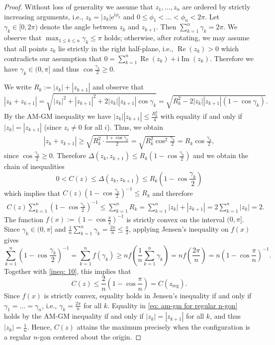 \documentclass[reqno,hidelinks,11pt]{amsart}
\numberwithin{equation}{section}
\begin{document}
\begin{proof}
Without loss of generality we assume that $z_1,\dots,z_n$ are ordered by strictly increasing arguments, i.e., $z_k = |z_k| \mathrm{e}^{\mathrm{i} \phi_k}$ and $0 \leq \phi_1 < \dots < \phi_n < 2\pi$.
Let $\gamma_k \in [0,2\pi)$ denote the angle between $z_k$ and $z_{k+1}$. Then $\sum_{k=1}^n \gamma_k = 2\pi$.
We observe that $\max_{1 \leq k \leq n} \gamma_k \leq \pi$ holds; otherwise, after rotating, we may assume that all points $z_k$ lie strictly in the right half-plane, i.e., $\operatorname{Re}(z_k)> 0$ which contradicts our assumption that $0=\sum_{k=1}^n \operatorname{Re}(z_k) + \mathrm{i} \operatorname{Im}(z_k)$.
Therefore we have $\gamma_k\in (0,\pi]$ and thus $\cos \frac{\gamma_k}{2} \geq 0$.

We write $R_k:=|z_k|+|z_{k+1}|$ and observe that
\[ 
|z_k+z_{k+1}|= \sqrt{|z_k|^2+|z_{k+1}|^2+2|z_k| |z_{k+1}| \cos \gamma_k} = \sqrt{R_k^2-2|z_k| |z_{k+1}| (1-\cos \gamma_k)}.
\]
By the AM-GM inequality we have $|z_k| |z_{k+1}| \leq \frac{R_k^2}{4}$ with equality if and only if $|z_k|=|z_{k+1}|$ (since $z_i \neq 0$ for all $i$). Thus, we obtain 
\begin{align}\label{eq: am-gm for regular n-gon}
|z_k+z_{k+1}|\geq \sqrt{R_k^2 \cdot \frac{1+\cos \gamma_k}{2}} = \sqrt{R_k^2 \cos^2 \frac{\gamma_k}{2} }= R_k \cos \frac{\gamma_k}{2},    
\end{align}
since $\cos \frac{\gamma_k}{2} \geq 0 $. 
Therefore $\Delta(z_k,z_{k+1}) \leq R_k \left( 1-\cos  \frac{\gamma_k}{2} \right)$ and we obtain the chain of inequalities
\[ 0 < C(z) \leq \Delta (z_k,z_{k+1}) \leq R_k\left( 1-\cos \frac{\gamma_k}{2} \right)\]
which implies that
$C(z)\left(1-\cos \frac{\gamma_k}{2}\right)^{-1} \leq R_k$
and therefore 
\begin{align} \label{ineq: 10}
    C(z) \sum_{k=1}^n \left(1-\cos \frac{\gamma_k}{2}\right)^{-1} \leq \sum_{k=1}^nR_k = \sum_{k=1}^n |z_k|+|z_{k+1}| = 2 \sum_{k=1}^n |z_k|=2.
\end{align}
The function $f(x):=(1-\cos \frac{x}{2})^{-1}$ is strictly convex on the interval $(0,\pi]$. Since $\gamma_k \in (0,\pi]$ and $\frac{1}{n}\sum_{k=1}^n \gamma_k = \frac{2\pi}{n} \leq \frac{\pi}{2}$, applying Jensen's inequality on $f(x)$ gives
\[\sum_{k=1}^n  \left(1-\cos \frac{\gamma_k}{2}\right)^{-1}= \sum_{k=1}^n f(\gamma_k) \geq n f\left(\frac{1}{n}\sum_{k=1}^n \gamma_k \right) = n f\left(\frac{2\pi}{n} \right) = n\left(1-\cos\frac{\pi}{n}\right)^{-1}.\]
Together with \eqref{ineq: 10}, this implies that
\[C(z) \leq \frac{2}{n}\left(1-\cos\frac{\pi}{n}\right)= C(z_{\operatorname{reg}}).\]
Since $f(x)$ is strictly convex, equality holds in Jensen's inequality if and only if $\gamma_1=\dots=\gamma_n$, i.e., $\gamma_k = \frac{2\pi}{n}$ for all $k$. Equality in \eqref{eq: am-gm for regular n-gon} holds by the AM-GM inequality if and only if $|z_k|=|z_{k+1}|$ for all $k$, and thus $|z_k|=\frac{1}{n}$. Hence, $C(z)$ attains the maximum precisely when the configuration is a regular $n$-gon centered about the origin.
\end{proof}
\end{document}
